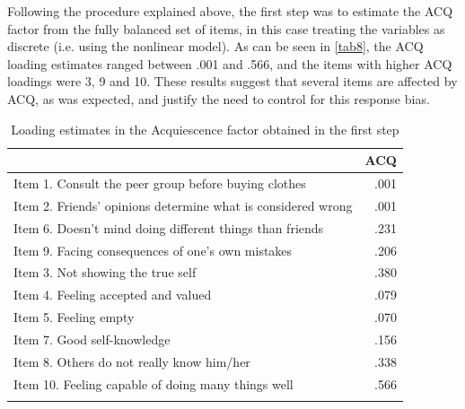Following the procedure explained above, the first step was to estimate the ACQ factor from the fully balanced set of items, in this case treating the variables as discrete (i.e. using the nonlinear model). As can be seen in \cref{tab8}, the ACQ loading estimates ranged between .001 and .566, and the items with higher ACQ loadings were 3, 9 and 10. These results suggest that several items are affected by ACQ, as was expected, and justify the need to control for this response bias.

\begin{table}[H]
  \caption{\label{tab7}Loading estimates in the Acquiescence factor obtained in the first step}
  \centering
  \begin{tabular}{ l r}
    \hline\noalign{\smallskip}
    &  ACQ\\
    \hline\noalign{\smallskip}
    Item 1. Consult the peer group before buying clothes      & .001 \\
    Item 2. Friends' opinions determine what is considered wrong  & .001 \\
    Item 6. Doesn't mind doing different things than friends      & .231 \\
    Item 9. Facing consequences of one's own mistakes      & .206 \\
    Item 3. Not showing the true self              & .380 \\
    Item 4. Feeling accepted and valued            & .079 \\
    Item 5. Feeling empty                  & .070 \\
    Item 7. Good self-knowledge              & .156 \\
    Item 8. Others do not really know him/her          & .338 \\
    Item 10. Feeling capable of doing many things well      & .566 \\
    \hline\noalign{\smallskip}
    \multicolumn{2}{l}{Note: ACQ = Acquiescence}
  \end{tabular}

\end{table}

